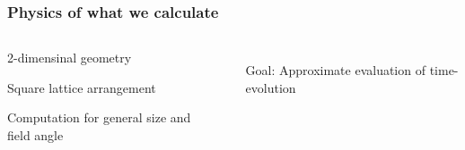 \begin{frame}
    \frametitle{Physics of what we calculate}

    \begin{columns}
            \begin{wideitemize}
                \item 2-dimensinal geometry
                \item Square lattice arrangement
                \item Computation for general size and field angle
            \end{wideitemize}
            
            \vspace{0.5cm}
            \begin{itemize}
                \item[Goal:]
                Approximate evaluation of time-evolution
            \end{itemize}

            
    \end{columns}
\end{frame}

